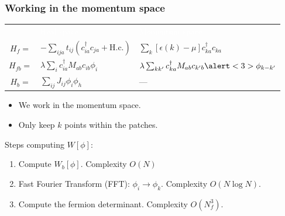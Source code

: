 \documentclass[xcolor=table, 10pt, aspectratio=43]{beamer}
\renewcommand{\arraystretch}{1.5}
\begin{document}
\begin{frame}
  \frametitle{Working in the momentum space}
  \begin{table}
    \renewcommand{\arraystretch}{2.5}
  \begin{tabularx}{\columnwidth}{cxx}
    & \textcolor{white}{Real space}
    & \textcolor{white}{Momentum space}\\
    $H_f = $ & $-\sum_{ija}t_{ij}(c_{ia}^\dagger c_{ja}+\text{H.c.})$
    & $\sum_k[\epsilon(k)-\mu]c_{ka}^\dagger c_{ka}$\\
    $H_{fb} = $
    & $\lambda\sum_ic_{ia}^\dagger M_{ab}c_{ib}\phi_i$
    & $\lambda\sum_{kk^\prime}c_{ka}^\dagger M_{ab}c_{k^\prime b}
    \alert<3>{\phi_{k-k^\prime}}$\\
		$H_b=$ & $\sum_{ij}J_{ij}\phi_i\phi_h$ & ---
  \end{tabularx}
  \end{table}
  \begin{itemize}
    \item We work in the momentum space.
    \item Only keep $k$ points within the patches.
  \end{itemize}
  Steps computing $W[\phi]$:
  \begin{enumerate}
    \item<2-4> Compute $W_b[\phi]$. Complexity $O(N)$
    \item<3-4> Fast Fourier Transform (FFT): $\phi_i\rightarrow\phi_k$. Complexity $O(N\log N)$.
    \item<4-5> Compute the fermion determinant. Complexity $O(N_f^3)$.
  \end{enumerate}
\end{frame}
\end{document}
